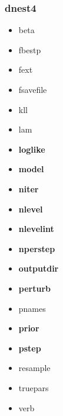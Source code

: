 \documentclass[letterpaper, 12pt]{article}
\begin{document}
\subsubsection{dnest4}
\begin{itemize}
\item beta
\item fbestp
\item fext
\item fsavefile
\item kll
\item lam
\item \textbf{loglike}
\item \textbf{model}
\item \textbf{niter}
\item \textbf{nlevel}
\item \textbf{nlevelint}
\item \textbf{nperstep}
\item \textbf{outputdir}
\item \textbf{perturb}
\item pnames
\item \textbf{prior}
\item \textbf{pstep}
\item resample
\item truepars
\item verb
\end{itemize}
\end{document}
